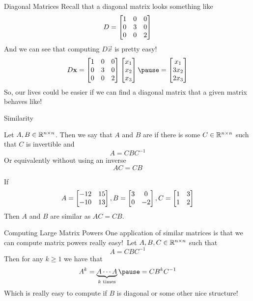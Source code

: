 \documentclass[xcoler=dvipsnames, aspectratio=169]{beamer}
\date{Similar Matrices}
\begin{document}
    \begin{frame}{Diagonal Matrices}
        Recall that a diagonal matrix looks something like
        \[
            D = \begin{bmatrix}
                1 & 0 & 0\\
                0 & 3 & 0\\
                0 & 0 & 2
            \end{bmatrix}
        \]\pause
        And we can see that computing $D\vec{x}$ is pretty easy!
        \[
            D\vec{x} = \bMat{
                1 & 0 & 0\\
                0 & 3 & 0\\
                0 & 0 & 2
            }\bMat{
                x_1\\x_2\\x_3
            }\pause = \bMat{
                x_1\\
                3x_2\\
                2x_3
            }
        \]\pause
        So, our lives could be easier if we can find a diagonal matrix that a given matrix behaves like!
    \end{frame}
    \begin{frame}{Similarity}
        \small
        \begin{defn}
            Let $A,B\in\mathbb{R}^{n\times n}$. Then we say that $A$ and $B$ are  if there is
            some $C\in\mathbb{R}^{n\times n}$ such that $C$ is invertible and
            \[
                A = CBC^{-1}
            \]\pause
            Or equivalently without using an inverse
            \[
                AC = CB
            \]\pause
        \end{defn}
        \begin{example}
            If 
            \[
                A=\begin{bmatrix}
                    -12 & 15\\
                    -10 & 13
                \end{bmatrix}, B=\begin{bmatrix}
                    3 & 0\\
                    0 &-2
                \end{bmatrix}, C=\begin{bmatrix}
                    1&3\\
                    1&2
                \end{bmatrix}
            \]
            Then
            $A$ and $B$ are similar as $AC=CB$.
        \end{example}
    \end{frame}
    \begin{frame}{Computing Large Matrix Powers}
        One application of similar matrices is that we can compute matrix powers really easy!\pause\
        Let $A,B,C\in\mathbb{R}^{n\times n}$ such that
        \[
            A = CBC^{-1}
        \]\pause
        Then for any $k\geq 1$ we have that
        \[
            A^k = \underbrace{A\cdots A}_{k\textnormal{ times}}\pause = CB^kC^{-1}
        \]\pause
        Which is really easy to compute if $B$ is diagonal or some other nice structure!
    \end{frame}
\end{document}
